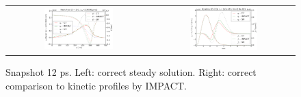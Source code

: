 \documentclass[preprint,12pt]{elsarticle}
\newcommand{\figscale}{0.5}
\begin{document}
\begin{figure}[tbh]
  \begin{center}
    \begin{tabular}{cc}
      \includegraphics[width=\figscale\textwidth]{../VFPdata/C7_Impact_case1_heatflux.png} &
      \includegraphics[width=\figscale\textwidth]{../VFPdata/C7_Impact_case1_kinetics.png}
    \end{tabular}
  \caption{  
  Snapshot 12 ps. Left: correct steady solution. Right: correct comparison to kinetic profiles by IMPACT.}
  \end{center}
  \label{fig:C7_IMPACT_case1}
\end{figure}
\end{document}
